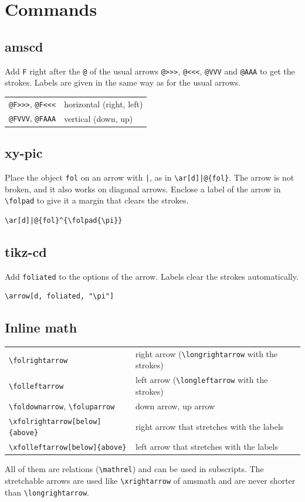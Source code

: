 \documentclass[dvipdfmx,a4paper]{article}
\newcommand\pkg[1]{\textsf{#1}}
\begin{document}
\section{Commands}

\subsection{amscd}
Add \verb|F| right after the \verb|@| of the usual arrows \verb|@>>>|, \verb|@<<<|, \verb|@VVV|
and \verb|@AAA| to get the strokes. Labels are given in the same way as for the usual arrows.
\begin{center}
\begin{tabular}{ll}
\verb|@F>>>|, \verb|@F<<<| & horizontal (right, left)\\
\verb|@FVVV|, \verb|@FAAA| & vertical (down, up)
\end{tabular}
\end{center}

\subsection{xy-pic}
Place the object \verb|fol| on an arrow with \verb/|/, as in \verb/\ar[d]|@{fol}/. The arrow is
not broken, and it also works on diagonal arrows. Enclose a label of the arrow in \verb|\folpad|
to give it a margin that clears the strokes.
\begin{Verbatim}
\ar[d]|@{fol}^{\folpad{\pi}}
\end{Verbatim}

\subsection{tikz-cd}
Add \verb|foliated| to the options of the arrow. Labels clear the strokes automatically.
\begin{Verbatim}
\arrow[d, foliated, "\pi"]
\end{Verbatim}

\subsection{Inline math}
\begin{center}
\begin{tabular}{ll}
\verb|\folrightarrow| & right arrow (\verb|\longrightarrow| with the strokes)\\
\verb|\folleftarrow| & left arrow (\verb|\longleftarrow| with the strokes)\\
\verb|\foldownarrow|, \verb|\foluparrow| & down arrow, up arrow\\
\verb|\xfolrightarrow[below]{above}| & right arrow that stretches with the labels\\
\verb|\xfolleftarrow[below]{above}| & left arrow that stretches with the labels
\end{tabular}
\end{center}
All of them are relations (\verb|\mathrel|) and can be used in subscripts. The stretchable arrows
are used like \verb|\xrightarrow| of \pkg{amsmath} and are never shorter than
\verb|\longrightarrow|.
\end{document}
